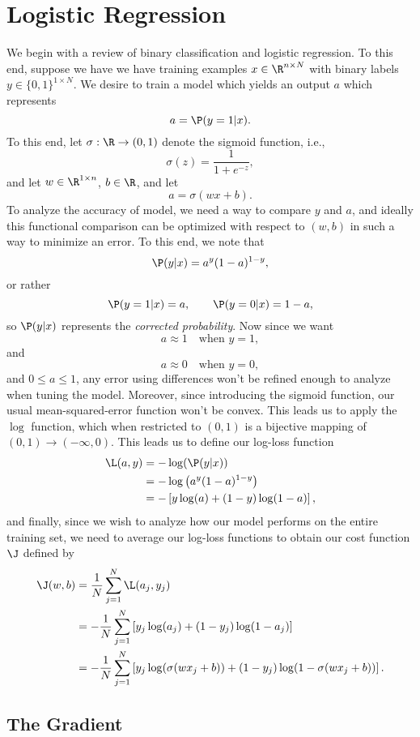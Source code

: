 

\section{Logistic Regression}

We begin with a review of binary classification and logistic regression.  To this end, suppose we have we have training examples $x\in\R^{n\times N}$ with binary labels $y\in\{0,1\}^{1\times N}$.  We desire to train a model which yields an output $a$ which represents
$$a=\P(y=1|x).$$
To this end, let $\sigma:\R\to(0,1)$ denote the sigmoid function, i.e.,
$$\sigma(z)=\frac{1}{1+e^{-z}},$$
and let $w\in\R^{1\times n}$, $b\in\R$, and let
$$a=\sigma(wx+b).$$
To analyze the accuracy of model, we need a way to compare $y$ and $a$, and ideally this functional comparison can be optimized with respect to $(w,b)$ in such a way to minimize an error.  To this end, we note that
$$\P(y|x)=a^y(1-a)^{1-y},$$
or rather
$$\P(y=1|x)=a,\qquad\P(y=0|x)=1-a,$$
so $\P(y|x)$ represents the \textit{corrected probability}.    Now since we want
$$a\approx 1\quad\text{when } y=1,$$
and
$$a\approx 0\quad\text{when } y=0,$$
and $0\leq a\leq 1$, any error using differences won't be refined enough to analyze when tuning the model.  Moreover, since introducing the sigmoid function, our usual mean-squared-error function won't be convex.  This leads us to apply the $\log$ function, which when restricted to $(0,1)$ is a bijective mapping of $(0,1)\to(-\infty,0)$.  This leads us to define our log-loss function
\begin{align*}
	\L(a,y)&=-\log(\P(y|x))\\
	&=-\log\left(a^y(1-a)^{1-y}\right)\\
	&=-\left[y\log(a)+(1-y)\log(1-a)\right],
\end{align*}
and finally, since we wish to analyze how our model performs on the entire training set, we need to average our log-loss functions to obtain our cost function $\J$ defined by
\begin{align*}
	\J(w,b)&=\frac{1}{N}\sum_{j=1}^N\L(a_j,y_j)\\
	&=-\frac{1}{N}\sum_{j=1}^N\left[y_j\log(a_j)+(1-y_j)\log(1-a_j)\right]\\
	&=-\frac{1}{N}\sum_{j=1}^N\left[y_j\log(\sigma(wx_j+b))+(1-y_j)\log(1-\sigma(wx_j+b))\right].
\end{align*}

\subsection{The Gradient}

